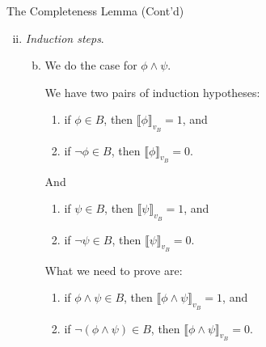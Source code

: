 \begin{frame}{The Completeness Lemma (Cont'd)}

\begin{enumerate}[(i)]
	
	\setcounter{enumi}{1}
	
	\item \emph{Induction steps}.
	
		\begin{enumerate}[(a)]
			\setcounter{enumii}{1}

				\item We do the case for $\phi\land \psi$.
				
				We have two pairs of induction hypotheses:
		\begin{enumerate}[1$_\phi$.]
	
		\item if $\phi\in B$, then $\llbracket\phi\rrbracket_{v_B}=1$, and 
		\item if $\neg \phi\in B$, then $\llbracket\phi\rrbracket_{v_B}=0$.
	
	\end{enumerate}
	
	And
	
	\begin{enumerate}[1$_\psi$.]
	
		\item if $\psi\in B$, then $\llbracket\psi\rrbracket_{v_B}=1$, and 
		\item if $\neg \psi\in B$, then $\llbracket\psi\rrbracket_{v_B}=0$.
	
	\end{enumerate}
	What we need to prove are:
	\begin{enumerate}
	
		\item if $\phi\land \psi\in B$, then $\llbracket\phi\land \psi\rrbracket_{v_B}=1$, and 
		\item if $\neg (\phi\land \psi)\in B$, then $\llbracket\phi\land \psi\rrbracket_{v_B}=0$.
	\end{enumerate}
		
	
		\end{enumerate}
	
	\end{enumerate}
	
\end{frame}

